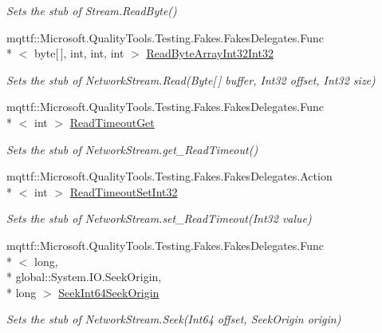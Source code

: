 \begin{DoxyCompactItemize}
\begin{DoxyCompactList}\small\item\em Sets the stub of Stream.\-Read\-Byte()\end{DoxyCompactList}\item 
mqttf\-::\-Microsoft.\-Quality\-Tools.\-Testing.\-Fakes.\-Fakes\-Delegates.\-Func\\*
$<$ byte\mbox{[}$\,$\mbox{]}, int, int, int $>$ \hyperlink{class_system_1_1_net_1_1_sockets_1_1_fakes_1_1_stub_network_stream_a41f6c35c91d6f30989a4b1c0fbb1425b}{Read\-Byte\-Array\-Int32\-Int32}
\begin{DoxyCompactList}\small\item\em Sets the stub of Network\-Stream.\-Read(\-Byte\mbox{[}$\,$\mbox{]} buffer, Int32 offset, Int32 size)\end{DoxyCompactList}\item 
mqttf\-::\-Microsoft.\-Quality\-Tools.\-Testing.\-Fakes.\-Fakes\-Delegates.\-Func\\*
$<$ int $>$ \hyperlink{class_system_1_1_net_1_1_sockets_1_1_fakes_1_1_stub_network_stream_a966c95224f949ae725c06c1ab9b22e27}{Read\-Timeout\-Get}
\begin{DoxyCompactList}\small\item\em Sets the stub of Network\-Stream.\-get\-\_\-\-Read\-Timeout()\end{DoxyCompactList}\item 
mqttf\-::\-Microsoft.\-Quality\-Tools.\-Testing.\-Fakes.\-Fakes\-Delegates.\-Action\\*
$<$ int $>$ \hyperlink{class_system_1_1_net_1_1_sockets_1_1_fakes_1_1_stub_network_stream_a63f017787e6f9a71bafe280da66b8d5d}{Read\-Timeout\-Set\-Int32}
\begin{DoxyCompactList}\small\item\em Sets the stub of Network\-Stream.\-set\-\_\-\-Read\-Timeout(\-Int32 value)\end{DoxyCompactList}\item 
mqttf\-::\-Microsoft.\-Quality\-Tools.\-Testing.\-Fakes.\-Fakes\-Delegates.\-Func\\*
$<$ long, \\*
global\-::\-System.\-I\-O.\-Seek\-Origin, \\*
long $>$ \hyperlink{class_system_1_1_net_1_1_sockets_1_1_fakes_1_1_stub_network_stream_a1fc40cdea2f4c6693f5b1c9d5ee17038}{Seek\-Int64\-Seek\-Origin}
\begin{DoxyCompactList}\small\item\em Sets the stub of Network\-Stream.\-Seek(\-Int64 offset, Seek\-Origin origin)\end{DoxyCompactList}\item 

\end{DoxyCompactItemize}

